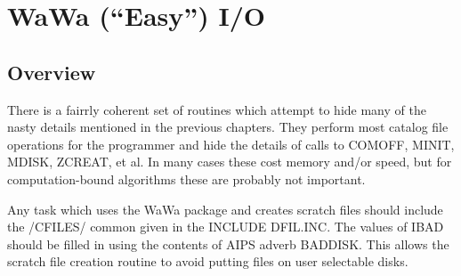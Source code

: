 \setcounter{chapter}{7} %
\chapter{WaWa (``Easy'') I/O}
\setcounter{page}{1}

\section{Overview}
There is a fairrly coherent set of routines which attempt to
hide many of the nasty details mentioned in the previous chapters.
They perform most catalog file operations for the programmer and hide
the details of calls to COMOFF, MINIT, MDISK, ZCREAT, et al.  In many
cases these cost memory and/or speed, but for computation-bound
algorithms these are probably not important.

Any task which uses the WaWa package and creates scratch files should
include the /CFILES/ common given in the INCLUDE DFIL.INC.
The values of IBAD should be filled in using the contents
of AIPS adverb BADDISK.  This allows the scratch file creation routine
to avoid putting files on user selectable disks.

